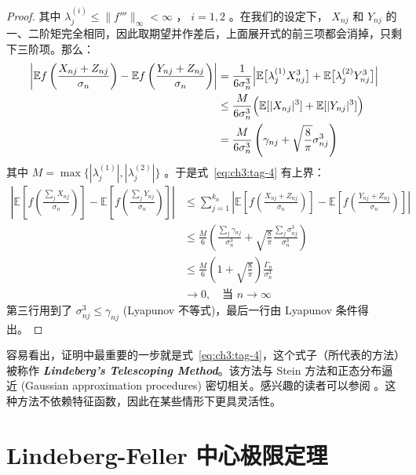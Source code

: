 \begin{proof}
其中 $\lambda_j^{(i)}\le \|f'''\|_\infty<\infty$ ， $i=1,2$ 。在我们的设定下， $X_{nj}$ 和 $Y_{nj}$ 的一、二阶矩完全相同，因此取期望并作差后，上面展开式的前三项都会消掉，只剩下三阶项。那么：
\[\begin{aligned} \left|\mathbb{E}f\left(\frac{X_{nj}+Z_{nj}}{\sigma_n}\right) - \mathbb{E}f\left(\frac{Y_{nj}+Z_{nj}}{\sigma_n}\right)\right| &=\frac 1{6\sigma_n^3}\Bigl|\mathbb{E}\bigl[\lambda_j^{(1)}X_{nj}^3\bigr]+\mathbb{E}\bigl[\lambda_j^{(2)}Y_{nj}^3\bigr]\Bigr|\\ &\le \frac{M}{6\sigma_n^3}\Bigl( \mathbb{E}[|X_{nj}|^3] + \mathbb{E}[|Y_{nj}|^3] \Bigr)\\ &=\frac{M}{6\sigma_n^3}\left(\gamma_{nj}+\sqrt{\frac{8}{\pi}}\sigma_{nj}^3\right) \end{aligned}\]
其中 $M=\max\big\{|\lambda_j^{(1)}|,|\lambda_j^{(2)}|\big\}$ 。于是式~\eqref{eq:ch3:tag-4} 有上界：
\[\begin{aligned} \left|\mathbb{E}\left[f\left(\frac{\sum_jX_{nj}}{\sigma_n}\right)\right]- \mathbb{E}\left[f\left(\frac{\sum_jY_{nj}}{\sigma_n}\right)\right]\right| &\le \sum_{j=1}^{k_n}\left|\mathbb{E}\left[f\left(\frac{X_{nj}+Z_{nj}}{\sigma_n}\right)\right]- \mathbb{E}\left[f\left(\frac{Y_{nj}+Z_{nj}}{\sigma_n}\right)\right]\right|\\ &\le \frac{M}{6}\left(\frac{\sum_j\gamma_{nj}}{\sigma_n^3}+\sqrt{\frac{8}{\pi}}\frac{\sum_j\sigma_{nj}^3}{\sigma_n^3}\right)\\ &\le \frac{M}{6}\left(1+\sqrt{\frac8\pi}\right)\frac{\Gamma_n}{\sigma_n^3}\\ &\to 0,\quad \text{当 }n\to\infty \end{aligned}\]
第三行用到了 $\sigma_{nj}^{3} \leq \gamma_{nj}$ (Lyapunov 不等式)，最后一行由 Lyapunov 条件得出。

\end{proof}

\begin{remark}
容易看出，证明中最重要的一步就是式~\eqref{eq:ch3:tag-4}，这个式子（所代表的方法）被称作 \textbf{\emph{Lindeberg's Telescoping Method}}。该方法与 Stein 方法和正态分布逼近 (Gaussian approximation procedures) 密切相关。感兴趣的读者可以参阅 \cite{chernozhukov2013}。这种方法不依赖特征函数，因此在某些情形下更具灵活性。
\end{remark}

\section{Lindeberg-Feller 中心极限定理}

